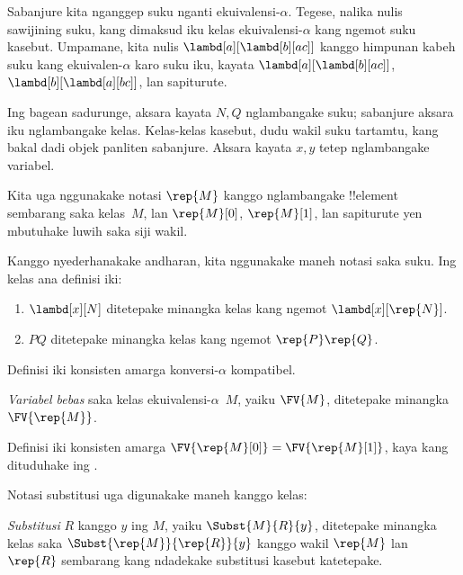 \documentclass[../../../include/open-logic-section]{subfiles}
\begin{document}

Sabanjure kita nganggep suku
nganti ekuivalensi-$\alpha$.
Tegese, nalika nulis sawijining
suku, kang dimaksud iku kelas
ekuivalensi-$\alpha$ kang ngemot suku
kasebut. Umpamane, kita nulis
$\lambd[a][\lambd[b][a c]]$
kanggo himpunan kabeh suku kang
ekuivalen-$\alpha$ karo suku iku,
kayata $\lambd[a][\lambd[b][a
    c]]$, $\lambd[b][\lambd[a][b c]]$,
lan sapiturute.

Ing bagean sadurunge, aksara
kayata $N, Q$ nglambangake suku;
sabanjure aksara iku nglambangake
kelas. Kelas-kelas kasebut, dudu
wakil suku tartamtu, kang bakal
dadi objek panliten sabanjure.
Aksara kayata $x, y$ tetep
nglambangake variabel.

Kita uga nggunakake notasi
$\rep{M}$ kanggo nglambangake
!!{element} sembarang saka kelas~$M$,
lan $\rep{M}[0]$, $\rep{M}[1]$,
lan sapiturute yen mbutuhake
luwih saka siji wakil.

Kanggo nyederhanakake andharan,
kita nggunakake maneh notasi
saka suku. Ing kelas ana
definisi iki:
\begin{defn}
  \begin{enumerate}
  \item $\lambd[x][N]$ ditetepake
    minangka kelas kang ngemot
    $\lambd[x][\rep{N}]$.
  \item $PQ$ ditetepake minangka
    kelas kang ngemot $\rep{P}\rep{Q}$.
  \end{enumerate}
\end{defn}

Definisi iki konsisten amarga
konversi-$\alpha$ kompatibel.

\begin{defn} 
  \emph{Variabel bebas} saka kelas
  ekuivalensi-$\alpha$~$M$, yaiku
  $\FV{M}$, ditetepake minangka
  $\FV{\rep{M}}$.
\end{defn}

Definisi iki konsisten amarga
$\FV{\rep{M}[0]} =
\FV{\rep{M}[1]}$, kaya kang
dituduhake ing .

Notasi substitusi uga digunakake
maneh kanggo kelas:
\begin{defn} 
  \emph{Substitusi} $R$ kanggo
  $y$ ing $M$, yaiku
  $\Subst{M}{R}{y}$, ditetepake
  minangka kelas saka
  $\Subst{\rep{M}}{\rep{R}}{y}$
  kanggo wakil $\rep{M}$
  lan $\rep{R}$ sembarang
  kang ndadekake substitusi
  kasebut katetepake.
\end{defn}
\end{document}

